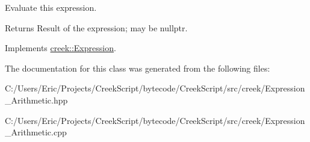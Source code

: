 Evaluate this expression. 

\begin{DoxyReturn}{Returns}
Result of the expression; may be {\ttfamily nullptr}. 
\end{DoxyReturn}


Implements \hyperlink{classcreek_1_1_expression_a3c7fe4a04e24c8d907f918240e2bf43d}{creek\+::\+Expression}.



The documentation for this class was generated from the following files\+:\begin{DoxyCompactItemize}
\item 
C\+:/\+Users/\+Eric/\+Projects/\+Creek\+Script/bytecode/\+Creek\+Script/src/creek/Expression\+\_\+\+Arithmetic.\+hpp\item 
C\+:/\+Users/\+Eric/\+Projects/\+Creek\+Script/bytecode/\+Creek\+Script/src/creek/Expression\+\_\+\+Arithmetic.\+cpp\end{DoxyCompactItemize}
